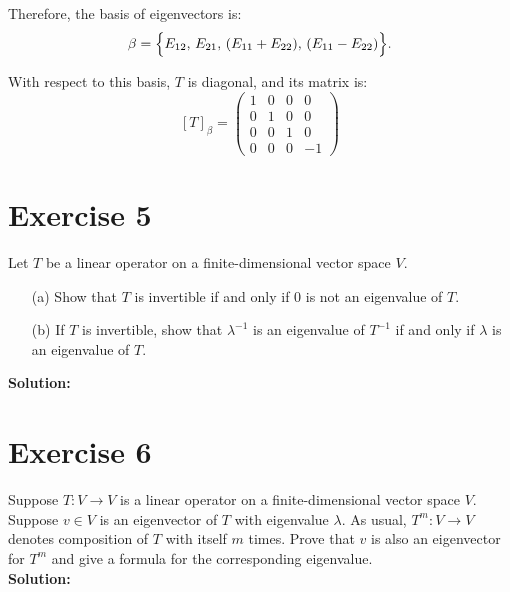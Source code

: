 \documentclass{article}
\begin{document}
Therefore, the basis of eigenvectors is:
\[
\beta = 
\Bigl\{
E_{12}, \, E_{21}, \, (E_{11} + E_{22}), \, (E_{11} - E_{22})
\Bigr\}.
\]

With respect to this basis, $T$ is diagonal, and its matrix is:
\[
[T]_{\beta}
=
\begin{pmatrix}
1 & 0 & 0 & 0 \\[4pt]
0 & 1 & 0 & 0 \\[4pt]
0 & 0 & 1 & 0 \\[4pt]
0 & 0 & 0 & -1
\end{pmatrix}
\]

\newpage

\section*{Exercise 5}
Let $T$ be a linear operator on a finite-dimensional vector space $V$.

\begin{enumerate}
    \item[(a)] Show that $T$ is invertible if and only if $0$ is not an eigenvalue of $T$.

    \item[(b)] If $T$ is invertible, show that $\lambda^{-1}$ is an eigenvalue of $T^{-1}$ if and only if $\lambda$ is an eigenvalue of $T$.
\end{enumerate}

\textbf{Solution:} \\



\newpage

\section*{Exercise 6}
Suppose $T : V \rightarrow V$ is a linear operator on a finite-dimensional vector space $V$. Suppose $v \in V$ is an eigenvector of $T$ with eigenvalue $\lambda$. As usual, $T^m : V \rightarrow V$ denotes composition of $T$ with itself $m$ times. Prove that $v$ is also an eigenvector for $T^m$ and give a formula for the corresponding eigenvalue. \\

\textbf{Solution:} \\



\newpage
\end{document}
